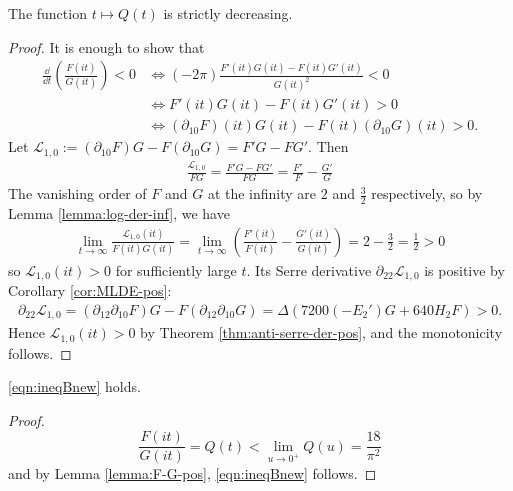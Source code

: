 \begin{proposition}\label{prop:Qdec}\leanok
The function $t \mapsto Q(t)$ is strictly decreasing.
\end{proposition}
\begin{proof}
It is enough to show that
\begin{align}
    \frac{\dd}{\dd t} \left(\frac{F(it)}{G(it)}\right) < 0 &\Leftrightarrow (- 2\pi) \frac{F'(it)G(it) - F(it) G'(it)}{G(it)^{2}} < 0 \\
    &\Leftrightarrow F'(it) G(it) - F(it) G'(it) > 0 \\
    &\Leftrightarrow (\partial_{10}F)(it) G(it) - F(it) (\partial_{10}G)(it) > 0.
\end{align}
Let $\mathcal{L}_{1, 0} := (\partial_{10}F) G - F (\partial_{10} G) = F'G - FG'$.
Then
\begin{align}
\frac{\mathcal{L}_{1, 0}}{FG} = \frac{F'G - FG'}{FG} = \frac{F'}{F} - \frac{G'}{G}
\end{align}
The vanishing order of $F$ and $G$ at the infinity are $2$ and $\frac{3}{2}$ respectively, so by Lemma \ref{lemma:log-der-inf}, we have
\begin{align}
    \lim_{t \to \infty} \frac{\mathcal{L}_{1, 0}(it)}{F(it) G(it)} = \lim_{t \to \infty} \left(\frac{F'(it)}{F(it)} - \frac{G'(it)}{G(it)}\right) = 2 - \frac{3}{2} = \frac{1}{2} > 0
\end{align}
so $\mathcal{L}_{1, 0}(it) > 0$ for sufficiently large $t$.
Its Serre derivative $\partial_{22} \mathcal{L}_{1, 0}$ is positive by Corollary \ref{cor:MLDE-pos}:
\begin{align}
    \partial_{22} \mathcal{L}_{1, 0} = (\partial_{12} \partial_{10} F) G - F (\partial_{12}\partial_{10} G)
    = \Delta (7200 (-E_{2}') G + 640 H_2 F) > 0.
\end{align}
Hence $\mathcal{L}_{1, 0}(it) > 0$ by Theorem \ref{thm:anti-serre-der-pos}, and the monotonicity follows.
\end{proof}


\begin{corollary}\label{cor:ineqBnew} 
\eqref{eqn:ineqBnew} holds.
\end{corollary}
\begin{proof}
\begin{equation}
    \frac{F(it)}{G(it)} = Q(t) < \lim_{u \to 0^+} Q(u) = \frac{18}{\pi^2}
\end{equation}
and by Lemma \ref{lemma:F-G-pos}, \eqref{eqn:ineqBnew} follows.
\end{proof}


